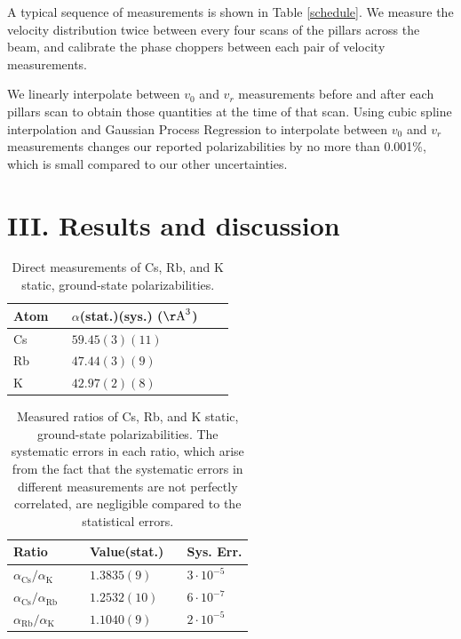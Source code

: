 \documentclass[twocolumn,prl,showpacs,superscriptaddress,longbibliography]{revtex4-1}   %
\newcommand{\sspace}{$\enspace$}
\newcommand{\ssspace}{$\quad$}
\newcommand{\ak}{\alpha_{\textrm{K}}}
\newcommand{\arb}{\alpha_{\textrm{Rb}}}
\newcommand{\acs}{\alpha_{\textrm{Cs}}}
\newcommand{\polK}{42.97(2)(8)}
\newcommand{\polRb}{47.44(3)(9)}
\newcommand{\polCs}{59.45(3)(11)}
\newcommand{\ratRbK}{1.1040(9)}
\newcommand{\ratCsK}{1.3835(9)}
\newcommand{\ratCsRb}{1.2532(10)}
\newcommand{\AAA}{\mathrm{\AA}}
\begin{document}
A typical sequence of measurements is shown in Table \ref{schedule}.
We measure the velocity distribution twice between every four scans of the pillars across the beam, and calibrate the phase choppers between each pair of velocity measurements.

We linearly interpolate between $v_0$ and $v_r$ measurements before and after each pillars scan to obtain those quantities at the time of that scan.
Using cubic spline interpolation and Gaussian Process Regression to interpolate between $v_0$ and $v_r$ measurements changes our reported polarizabilities by no more than 0.001\%, which is small compared to our other uncertainties.

\section{III. Results and discussion}

\begingroup
\begin{table}
\caption{\label{tableAbs}Direct measurements of Cs, Rb, and K static, ground-state polarizabilities.}
\begin{center}
\begin{tabular}{llll}
\hline\hline
Atom \sspace & $\alpha$(stat.)(sys.) ($\AAA^3$) \\
\hline
Cs & $\polCs$ \\
Rb & $\polRb$ \\
K  & $\polK$ \\
\hline\hline
\end{tabular}
\end{center}
\end{table}
\endgroup

\begingroup
\begin{table}
\caption{\label{tableRatio}Measured ratios of Cs, Rb, and K static, ground-state polarizabilities. The systematic errors in each ratio, which arise from the fact that the systematic errors in different measurements are not perfectly correlated, are negligible compared to the statistical errors.}
\begin{center}
\begin{tabular}{lll}
\hline\hline
Ratio \ssspace \ssspace & Value(stat.) \sspace & Sys. Err. \\
\hline
$\acs/\ak$  & $\ratCsK$ & $3\cdot 10^{-5}$  \\
$\acs/\arb$ & $\ratCsRb$ & $6\cdot 10^{-7}$ \\
$\arb/\ak$  & $\ratRbK$ & $2\cdot 10^{-5}$ \\
\hline\hline
\end{tabular}
\end{center}
\end{table}
\endgroup
\end{document}
